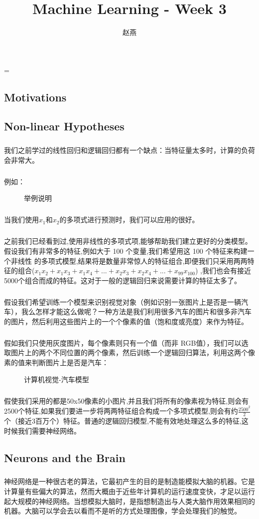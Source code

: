 \documentclass{article}
\title{Machine Learning - Week 3}
\author{赵燕}
\date{}
\begin{document}
 
\hfuzz=\maxdimen
{}
\begin{CJK}{UTF8}{gbsn} 
\maketitle
\renewcommand\contentsname{目录}
\renewcommand\figurename{图}
\tableofcontents
\newpage

\section{Motivations}
\subsection{Non-linear Hypotheses}
\subparagraph{}
我们之前学过的线性回归和逻辑回归都有一个缺点：当特征量太多时，计算的负荷会非常大。
\subparagraph{}
例如：
\begin{figure}[H]
\caption{举例说明}
\label{fig:402}
\end{figure}
\subparagraph{}
当我们使用$x_1$和$x_2$的多项式进行预测时，我们可以应用的很好。
\subparagraph{}
之前我们已经看到过,使用非线性的多项式项,能够帮助我们建立更好的分类模型。假设我们有非常多的特征,例如大于 100 个变量,我们希望用这 100 个特征来构建一个非线性
的多项式模型,结果将是数量非常惊人的特征组合,即便我们只采用两两特征的组合($x_1x_2+x_1x_3+x_1x_4+...+x_2x_3+x_2x_4+...+x_99x_100$) ,我们也会有接近 5000个组合而成的特征。这对于一般的逻辑回归来说需要计算的特征太多了。
\subparagraph{}
假设我们希望训练一个模型来识别视觉对象（例如识别一张图片上是否是一辆汽车），我么怎样才能这么做呢？一种方法是我们利用很多汽车的图片和很多非汽车的图片，然后利用这些图片上的一个个像素的值（饱和度或亮度）来作为特征。
\subparagraph{}
假如我们只使用灰度图片，每个像素则只有一个值（而非
RGB值），我们可以选取图片上的两个不同位置的两个像素，然后训练一个逻辑回归算法，利用这两个像素的值来判断图片上是否是汽车：
\begin{figure}[H]
\caption{计算机视觉-汽车模型}
\label{fig:403}
\end{figure}
\subparagraph{}
假使我们采用的都是50x50像素的小图片,并且我们将所有的像素视为特征,则会有2500个特征,如果我们要进一步将两两特征组合构成一个多项式模型,则会有约$\frac{2500^2}{2}$ 个（接近3百万个）特征。普通的逻辑回归模型,不能有效地处理这么多的特征,这时候我们需要神经网络。
\subsection{Neurons and the Brain}
\subparagraph{}
神经网络是一种很古老的算法，它最初产生的目的是制造能模拟大脑的机器。它是计算量有些偏大的算法，然而大概由于近些年计算机的运行速度变快，才足以运行起大规模的神经网络。当想模拟大脑时，是指想制造出与人类大脑作用效果相同的机器。大脑可以学会去以看而不是听的方式处理图像，学会处理我们的触觉。

\end{CJK}
\end{document}
